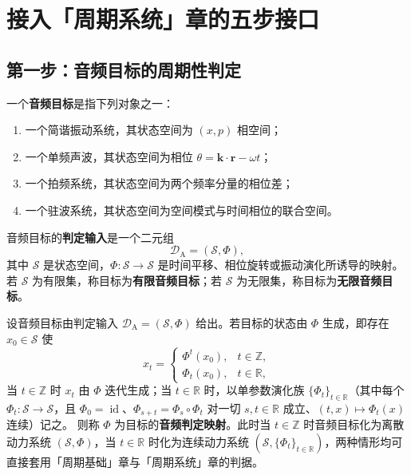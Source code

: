 \section{接入「周期系统」章的五步接口}
\label{sec:audio_five_steps}

\subsection{第一步：音频目标的周期性判定}

\begin{definition}[音频目标与判定输入]\label{def:audio_target}
一个\textbf{音频目标}是指下列对象之一：
\begin{enumerate}[label=(\roman*)]
    \item 一个简谐振动系统，其状态空间为 $(x,p)$ 相空间；
    \item 一个单频声波，其状态空间为相位 $\theta=\mathbf k\cdot\mathbf r-\omega t$；
    \item 一个拍频系统，其状态空间为两个频率分量的相位差；
    \item 一个驻波系统，其状态空间为空间模式与时间相位的联合空间。
\end{enumerate}
音频目标的\textbf{判定输入}是一个二元组
\[
\mathcal D_{\mathrm{A}}=(\mathcal S,\Phi),
\]
其中 $\mathcal S$ 是状态空间，$\Phi:\mathcal S\to\mathcal S$ 是时间平移、相位旋转或振动演化所诱导的映射。若 $\mathcal S$ 为有限集，称目标为\textbf{有限音频目标}；若 $\mathcal S$ 为无限集，称目标为\textbf{无限音频目标}。
\end{definition}

\begin{definition}[音频判定映射]\label{def:audio_periodization}
设音频目标由判定输入 $\mathcal D_{\mathrm{A}}=(\mathcal S,\Phi)$ 给出。若目标的状态由 $\Phi$ 生成，即存在 $x_0\in\mathcal S$ 使
\[
x_t=\begin{cases}\Phi^t(x_0), & t\in\mathbb Z,\\ \Phi_t(x_0), & t\in\mathbb R,\end{cases}
\]
当 $t\in\mathbb Z$ 时 $x_t$ 由 $\Phi$ 迭代生成；当 $t\in\mathbb R$ 时，以单参数演化族 $\{\Phi_t\}_{t\in\mathbb R}$（其中每个 $\Phi_t:\mathcal S\to\mathcal S$，且 $\Phi_0=\operatorname{id}$、$\Phi_{s+t}=\Phi_s\circ\Phi_t$ 对一切 $s,t\in\mathbb R$ 成立、$(t,x)\mapsto\Phi_t(x)$ 连续）记之。
则称 $\Phi$ 为目标的\textbf{音频判定映射}。此时当 $t\in\mathbb Z$ 时音频目标化为离散动力系统 $(\mathcal S,\Phi)$，当 $t\in\mathbb R$ 时化为连续动力系统 $(\mathcal S,\{\Phi_t\}_{t\in\mathbb R})$，两种情形均可直接套用「周期基础」章与「周期系统」章的判据。
\end{definition}

